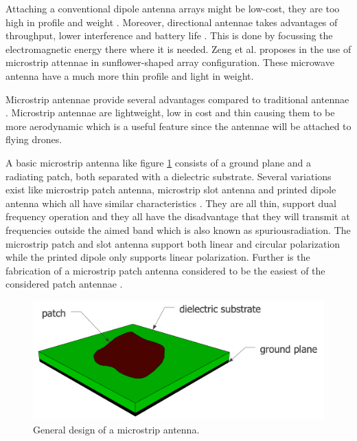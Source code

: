 Attaching a conventional dipole antenna arrays might be low-cost, they are too high in profile and weight \cite{A6}. Moreover,
directional antennae takes advantages of throughput, lower interference and battery life \cite{A7}. This is done by focussing the 
electromagnetic energy there where it is needed.
Zeng et al. proposes in \cite{A6} the use of microstrip attennae in sunflower-shaped array configuration. These microwave antenna
have a much more thin profile and light in weight.

Microstrip antennae provide several advantages compared to traditional antennae \cite{J13_singh2011micro, J14_antennadesign}. Microstrip antennae
are lightweight, low in cost and thin causing them to be more aerodynamic which is a useful feature since the antennae will be attached
to flying drones.

A basic microstrip antenna like figure \ref{fig:basicpatchantenna} consists of a ground plane and
a radiating patch, both separated with a dielectric substrate. 
Several variations exist like microstrip patch antenna, microstrip slot antenna and printed dipole antenna which
all have similar characteristics \cite{J13_singh2011micro, J14_antennadesign}. They are all thin, support dual frequency operation and they all have the disadvantage that they 
will transmit at frequencies outside the aimed band which is also known as
\gls{spuriousradiation}. The microstrip patch and slot antenna support both linear
and circular polarization while the printed dipole only supports linear polarization. Further is the fabrication of a microstrip patch antenna considered to be the easiest of the considered patch antennae \cite{J13_singh2011micro}. 

\begin{figure}[H]
\centering
  \includegraphics[width=\textwidth/2]{../images/patchantenna.png}
  \caption{General design of a microstrip antenna.}
  \label{fig:basicpatchantenna}
\end{figure}

